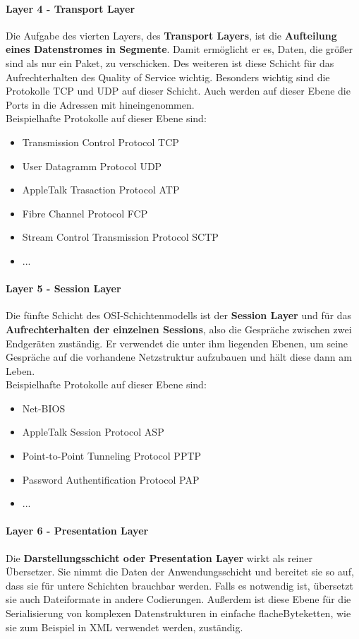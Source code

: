 \documentclass[12pt,a4paper]{report}
\begin{document}
\begin{onehalfspace}
\paragraph{Layer 4 - Transport Layer}
Die Aufgabe des vierten Layers, des \textbf{Transport Layers}, ist die \textbf{Aufteilung eines Datenstromes in Segmente}. Damit ermöglicht er es, Daten, die größer sind als nur ein Paket, zu verschicken. Des weiteren ist diese Schicht für das Aufrechterhalten des Quality of Service wichtig. Besonders wichtig sind die Protokolle TCP und UDP auf dieser Schicht. Auch werden auf dieser Ebene die Ports in die Adressen mit hineingenommen.\\

Beispielhafte Protokolle auf dieser Ebene sind:
\begin{itemize}
\item Transmission Control Protocol TCP
\item User Datagramm Protocol UDP
\item AppleTalk Trasaction Protocol ATP
\item Fibre Channel Protocol FCP
\item Stream Control Transmission Protocol SCTP
\item ...
\end{itemize}

\paragraph{Layer 5 - Session Layer}
Die fünfte Schicht des OSI-Schichtenmodells ist der \textbf{Session Layer} und für das \textbf{Aufrechterhalten der einzelnen Sessions}, also die Gespräche zwischen zwei Endgeräten zuständig. Er verwendet die unter ihm liegenden Ebenen, um seine Gespräche auf die vorhandene Netzstruktur aufzubauen und hält diese dann am Leben.\\

Beispielhafte Protokolle auf dieser Ebene sind:
\begin{itemize}
\item Net-BIOS
\item AppleTalk Session Protocol ASP
\item Point-to-Point Tunneling Protocol PPTP
\item Password Authentification Protocol PAP
\item ...
\end{itemize}

\paragraph{Layer 6 - Presentation Layer}
Die \textbf{Darstellungsschicht oder Presentation Layer} wirkt als reiner Übersetzer. Sie nimmt die Daten der Anwendungsschicht und bereitet sie so auf, dass sie für untere Schichten brauchbar werden. Falls es notwendig ist, übersetzt sie auch Dateiformate in andere Codierungen. Außerdem ist diese Ebene für die Serialisierung von komplexen Datenstrukturen in einfache \glqq flache\grqq  Byteketten, wie sie zum Beispiel in XML verwendet werden, zuständig.\\


\end{onehalfspace}
\end{document}
